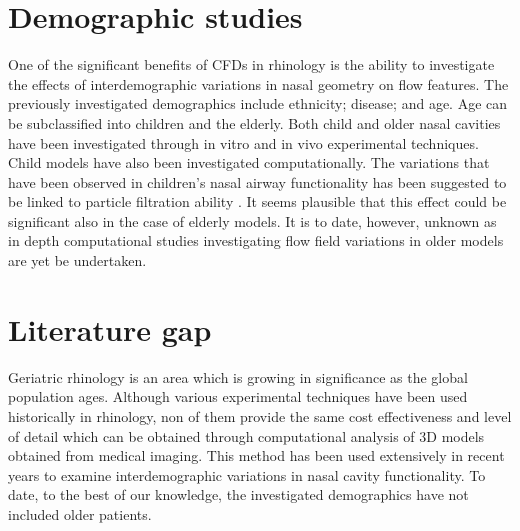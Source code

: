 \section{Demographic studies}
One of the significant benefits of CFDs in rhinology is the ability to investigate the effects of interdemographic variations in nasal geometry on flow features. The previously investigated demographics include ethnicity\cite{Zhu2011}; disease\cite{Garcia2007}; and  age\cite{Xi2012}. Age can be subclassified into children\cite{Xi2012} and the elderly\cite{Lindemann2008}. Both child and older nasal cavities have been investigated through in vitro\cite{Weinhold2004} and in vivo\cite{Kalmovich2005, Edelstein1996, WhanKim2007, Lindemann2008} experimental techniques. Child models have also been investigated computationally\cite{Xi2012}. The variations that have been observed in children's nasal airway functionality has been suggested to be linked to particle filtration ability \cite{Xi2012}. It seems plausible that this effect could be significant also in the case of elderly models. It is to date, however, unknown as in depth computational studies investigating flow field variations in older models are yet be undertaken.


\section{Literature gap}

Geriatric rhinology is an area which is growing in significance as the global population ages. Although various experimental techniques have been used historically in rhinology, non of them provide the same cost effectiveness and level of detail which can be obtained through computational analysis of 3D models obtained from medical imaging. This method has been used extensively in recent years to examine interdemographic variations in nasal cavity functionality. To date, to the best of our knowledge, the investigated demographics have not included older patients.
